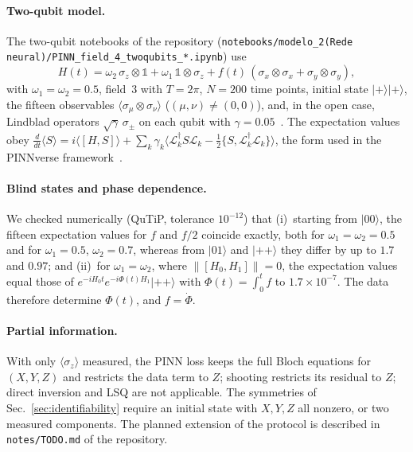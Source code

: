 \documentclass[aps,pra,onecolumn,superscriptaddress,11pt,longbibliography,floatfix,nofootinbib]{revtex4-2}
\begin{document}
\paragraph{Two-qubit model.} The two-qubit notebooks of the repository
(\texttt{notebooks/modelo\_2(Rede neural)/PINN\_field\_4\_twoqubits\_*.ipynb}) use
\begin{equation}
  H(t)=\omega_2\,\sigma_z\otimes\mathbb 1+\omega_1\,\mathbb 1\otimes\sigma_z
       +f(t)\,(\sigma_x\otimes\sigma_x+\sigma_y\otimes\sigma_y),
\end{equation}
with $\omega_1=\omega_2=0.5$, field~3 with $T=2\pi$, $N=200$ time points, initial state
$|{+}\rangle|{+}\rangle$, the fifteen observables $\langle\sigma_\mu\otimes\sigma_\nu\rangle$
($(\mu,\nu)\ne(0,0)$), and, in the open case, Lindblad operators $\sqrt{\gamma}\,\sigma_\pm$ on each qubit
with $\gamma=0.05$~\cite{lindblad1976,gorini1976}. The expectation values obey
$\frac{d}{dt}\langle S\rangle=i\langle[H,S]\rangle+\sum_k\gamma_k\langle\mathcal L_k^{\dagger}S\mathcal L_k
-\tfrac12\{S,\mathcal L_k^{\dagger}\mathcal L_k\}\rangle$, the form used in the PINNverse
framework~\cite{castelano2024freezing,delima2025pinnverse}.

\paragraph{Blind states and phase dependence.} We checked numerically (QuTiP, tolerance $10^{-12}$) that
(i)~starting from $|00\rangle$, the fifteen expectation values for $f$ and $f/2$ coincide exactly, both
for $\omega_1=\omega_2=0.5$ and for $\omega_1=0.5$, $\omega_2=0.7$, whereas from $|01\rangle$ and
$|{+}{+}\rangle$ they differ by up to $1.7$ and $0.97$; and (ii)~for $\omega_1=\omega_2$, where
$\|[H_0,H_1]\|=0$, the expectation values equal those of $e^{-iH_0t}e^{-i\Phi(t)H_1}|{+}{+}\rangle$
with $\Phi(t)=\int_0^tf$ to $1.7\times10^{-7}$. The data therefore determine $\Phi(t)$, and $f=\dot\Phi$.

\paragraph{Partial information.} With only $\langle\sigma_z\rangle$ measured, the PINN loss keeps the full
Bloch equations for $(X,Y,Z)$ and restricts the data term to $Z$; shooting restricts its residual to $Z$;
direct inversion and LSQ are not applicable. The symmetries of Sec.~\ref{sec:identifiability} require an
initial state with $X,Y,Z$ all nonzero, or two measured components. The planned extension of the
protocol is described in \texttt{notes/TODO.md} of the repository.



\end{document}
